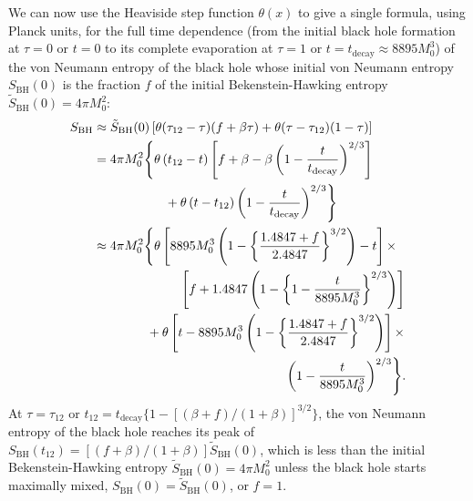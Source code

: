 \documentclass[12pt]{article}
\begin{document}
We can now use the Heaviside step function $\theta(x)$ to give a single formula, using Planck units, for the full time dependence (from the initial black hole formation at $\tau = 0$ or $t=0$ to its complete evaporation at $\tau = 1$ or $t = t_\mathrm{decay} \approx 8895 M_0^3$) of the von Neumann entropy of the black hole whose initial von Neumann entropy $S_\mathrm{BH}(0)$ is the fraction $f$ of the initial Bekenstein-Hawking entropy $\tilde{S}_\mathrm{BH}(0) = 4\pi M_0^2$:
\begin{equation}
\begin{split}
S_\mathrm{BH} \approx {} &
\tilde{S}_\mathrm{BH}(0)
\left[\theta(\tau_{12}-\tau)(f+\beta\tau) + \theta(\tau-\tau_{12})(1-\tau)\right]
\\
= {} &
4\pi M_0^2
\Biggl\{\theta\left(t_{12}-t\right)
\left[f+\beta-\beta\left(1-\frac{t}{t_\mathrm{decay}}\right)^{2/3}\right]
\\
& \hspace{15mm} +\theta\left(t-t_{12}\right)
\left(1-\frac{t}{t_\mathrm{decay}}\right)^{2/3}\Biggr\}
\\
\approx {} &
4\pi M_0^2 \Biggl\{\theta
\left[
8895 M_0^3\left(1-\left\{\frac{1.4847+f}{2.4847}\right\}^{3/2}\right)-t\right]
\times
\\
& \hspace{19mm}
\left[f+1.4847\left(1-\left\{1-\frac{t}{8895 M_0^3}\right\}^{2/3}\right)\right]
\\
& \hspace{10mm}
+\theta\left[t-8895 M_0^3
\left(1-\left\{\frac{1.4847+f}{2.4847}\right\}^{3/2}\right)\right] \times
\\
& \hspace{48mm}
\left(1-\frac{t}{8895 M_0^3}\right)^{2/3}\Biggr\}.
\label{impure-BH-von-Neumann-entropy-evolution}
\end{split}
\end{equation}
At $\tau=\tau_{12}$ or $t_{12} = t_\mathrm{decay}\{1 - [(\beta+f)/(1+\beta)]^{3/2}\}$, the von Neumann entropy of the black hole reaches its peak of $S_\mathrm{BH}(t_{12}) = [(f+\beta)/(1+\beta)]\tilde{S}_\mathrm{BH}(0)$, which is less than the initial Bekenstein-Hawking entropy $\tilde{S}_\mathrm{BH}(0) = 4\pi M_0^2$ unless the black hole starts maximally mixed, $S_\mathrm{BH}(0) = \tilde{S}_\mathrm{BH}(0)$, or $f=1$.
\end{document}
